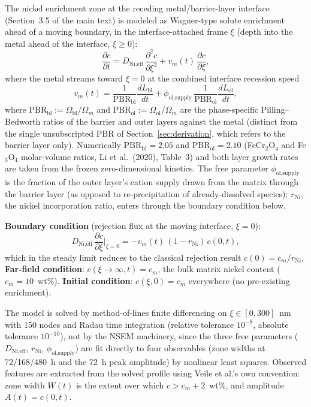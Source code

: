 The nickel enrichment zone at the receding metal/barrier-layer interface
(Section~3.5 of the main text) is modeled as Wagner-type solute
enrichment ahead of a moving boundary, in the interface-attached frame
$\xi$ (depth into the metal ahead of the interface, $\xi \ge 0$):
\begin{equation}
\frac{\partial c}{\partial t} = D_\text{Ni,eff}\,\frac{\partial^2 c}{\partial \xi^2}
+ v_m(t)\,\frac{\partial c}{\partial \xi},
\label{eq:wagner}
\end{equation}
where the metal streams toward $\xi=0$ at the combined interface
recession speed
\begin{equation}
v_m(t) = \frac{1}{\mathrm{PBR}_\mathrm{bl}}\frac{dL_\mathrm{bl}}{dt}
+ \phi_\text{ol,supply}\,\frac{1}{\mathrm{PBR}_\mathrm{ol}}\frac{dL_\mathrm{ol}}{dt},
\label{eq:vm}
\end{equation}
where $\mathrm{PBR}_\mathrm{bl} := \Omega_\mathrm{bl}/\Omega_m$ and
$\mathrm{PBR}_\mathrm{ol} := \Omega_\mathrm{ol}/\Omega_m$ are the
phase-specific Pilling--Bedworth ratios of the barrier and outer
layers against the metal (distinct from the single unsubscripted
$\mathrm{PBR}$ of Section~\ref{sec:derivation}, which refers to the
barrier layer only). Numerically $\mathrm{PBR}_\mathrm{bl} = 2.05$ and
$\mathrm{PBR}_\mathrm{ol} = 2.10$ (FeCr$_2$O$_4$ and Fe$_3$O$_4$
molar-volume ratios, Li et al.\ (2020), Table~3) and both layer growth
rates are taken from the frozen zero-dimensional kinetics. The free parameter $\phi_\text{ol,supply}$ is
the fraction of the outer layer's cation supply drawn from the matrix
through the barrier layer (as opposed to re-precipitation of
already-dissolved species); $r_\text{Ni}$, the nickel incorporation
ratio, enters through the boundary condition below.

\textbf{Boundary condition} (rejection flux at the moving interface,
$\xi=0$):
\begin{equation}
D_\text{Ni,eff}\,\frac{\partial c}{\partial \xi}\bigg|_{\xi=0}
= -v_m(t)\,(1 - r_\text{Ni})\,c(0,t),
\label{eq:ni-bc}
\end{equation}
which in the steady limit reduces to the classical rejection result
$c(0) = c_m/r_\text{Ni}$. \textbf{Far-field condition}:
$c(\xi \to \infty, t) = c_m$, the bulk matrix nickel content
($c_m = 10$~wt\%). \textbf{Initial condition}: $c(\xi, 0) = c_m$
everywhere (no pre-existing enrichment).

The model is solved by method-of-lines finite differencing on
$\xi \in [0, 300]$~nm with 150 nodes and Radau time integration
(relative tolerance $10^{-8}$, absolute tolerance $10^{-10}$), not by
the NSEM machinery, since the three free parameters
($D_\text{Ni,eff}$, $r_\text{Ni}$, $\phi_\text{ol,supply}$) are fit
directly to four observables (zone widths at 72/168/480~h and the 72~h
peak amplitude) by nonlinear least squares. Observed features are
extracted from the solved profile using Veile et al.'s own convention:
zone width $W(t)$ is the extent over which $c > c_m + 2$~wt\%, and
amplitude $A(t) = c(0,t)$.

